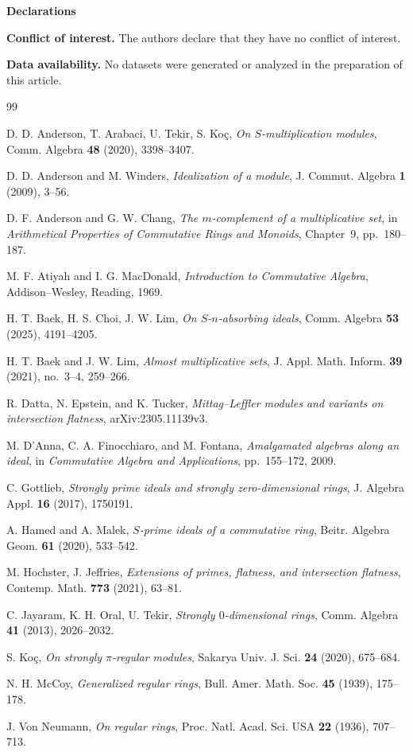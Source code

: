 \documentclass[11pt]{amsart}
\theoremstyle{definition}
\theoremstyle{remark}
\begin{document}
\bigskip
\noindent\textbf{Declarations}

\medskip
\noindent\textbf{Conflict of interest.} The authors declare that they have no conflict of interest.

\medskip
\noindent\textbf{Data availability.} No datasets were generated or analyzed in the preparation of this article.

\begin{thebibliography}{99}

D. D. Anderson, T. Arabaci, U. Tekir, S. Ko\c{c},
\emph{On $S$-multiplication modules},
Comm. Algebra \textbf{48} (2020), 3398--3407.

D. D. Anderson and M. Winders,
\emph{Idealization of a module},
J. Commut. Algebra \textbf{1} (2009), 3--56.

D. F. Anderson and G. W. Chang,
\emph{The $m$-complement of a multiplicative set},
in \emph{Arithmetical Properties of Commutative Rings and Monoids},
Chapter~9, pp.~180--187.

M. F. Atiyah and I. G. MacDonald,
\emph{Introduction to Commutative Algebra},
Addison--Wesley, Reading, 1969.

H. T. Baek, H. S. Choi, J. W. Lim,
\emph{On $S$-$n$-absorbing ideals},
Comm. Algebra \textbf{53} (2025), 4191--4205.

H. T. Baek and J. W. Lim,
\emph{Almost multiplicative sets},
J. Appl. Math. Inform. \textbf{39} (2021), no.~3--4, 259--266.

R. Datta, N. Epstein, and K. Tucker,
\emph{Mittag--Leffler modules and variants on intersection flatness},
arXiv:2305.11139v3.

M. D'Anna, C. A. Finocchiaro, and M. Fontana,
\emph{Amalgamated algebras along an ideal},
in \emph{Commutative Algebra and Applications}, pp.~155--172, 2009.

C. Gottlieb,
\emph{Strongly prime ideals and strongly zero-dimensional rings},
J. Algebra Appl. \textbf{16} (2017), 1750191.

A. Hamed and A. Malek,
\emph{$S$-prime ideals of a commutative ring},
Beitr. Algebra Geom. \textbf{61} (2020), 533--542.

M. Hochster, J. Jeffries,
\emph{Extensions of primes, flatness, and intersection flatness},
Contemp. Math. \textbf{773} (2021), 63--81.

C. Jayaram, K. H. Oral, U. Tekir,
\emph{Strongly $0$-dimensional rings},
Comm. Algebra \textbf{41} (2013), 2026--2032.

S. Koç,
\emph{On strongly $\pi$-regular modules},
Sakarya Univ. J. Sci. \textbf{24} (2020), 675--684.

N. H. McCoy,
\emph{Generalized regular rings},
Bull. Amer. Math. Soc. \textbf{45} (1939), 175--178.

J. Von Neumann,
\emph{On regular rings},
Proc. Natl. Acad. Sci. USA \textbf{22} (1936), 707--713.

\end{thebibliography}
\end{document}
